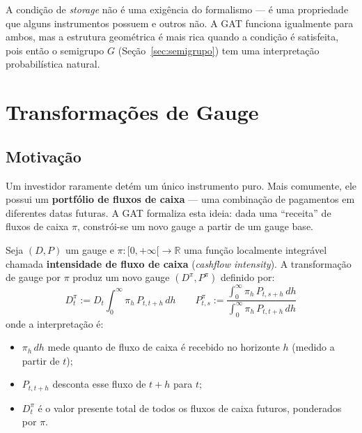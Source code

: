 A condi\c{c}\~ao de \textit{storage} n\~ao \'e uma exig\^encia do
formalismo --- \'e uma propriedade que alguns instrumentos possuem e
outros n\~ao. A GAT funciona igualmente para ambos, mas a estrutura
geom\'etrica \'e mais rica quando a condi\c{c}\~ao \'e satisfeita,
pois ent\~ao o semigrupo $G$ (Se\c{c}\~ao~\ref{sec:semigrupo}) tem
uma interpreta\c{c}\~ao probabil\'istica natural.

\section{Transforma\c{c}\~oes de Gauge}

\subsection{Motiva\c{c}\~ao}

Um investidor raramente det\'em um \'unico instrumento puro. Mais
comumente, ele possui um \textbf{portf\'olio de fluxos de caixa} ---
uma combina\c{c}\~ao de pagamentos em diferentes datas futuras. A GAT
formaliza esta ideia: dada uma ``receita'' de fluxos de caixa $\pi$,
constr\'oi-se um novo gauge a partir de um gauge base.

\begin{defi}\label{def:gauge_transform}
Seja $(D,P)$ um gauge e $\pi: [0,+\infty[ \to \mathbb{R}$ uma
fun\c{c}\~ao localmente integr\'avel chamada \textbf{intensidade de
fluxo de caixa} (\textit{cashflow intensity}). A transforma\c{c}\~ao de
gauge por $\pi$ produz um novo gauge $(D^\pi, P^\pi)$ definido por:
\[
\boxed{D_t^\pi := D_t \int_0^\infty \pi_h\, P_{t,t+h}\,dh}
\qquad
\boxed{P_{t,s}^\pi := \frac{\displaystyle\int_0^\infty \pi_h\, P_{t,s+h}\,dh}
 {\displaystyle\int_0^\infty \pi_h\, P_{t,t+h}\,dh}}
\]
onde a interpreta\c{c}\~ao \'e:
\begin{itemize}[nosep]
 \item $\pi_h\,dh$ mede quanto de fluxo de caixa \'e recebido no
 horizonte $h$ (medido a partir de $t$);
 \item $P_{t,t+h}$ desconta esse fluxo de $t+h$ para $t$;
 \item $D_t^\pi$ \'e o valor presente total de todos os fluxos de
 caixa futuros, ponderados por $\pi$.
\end{itemize}
\end{defi}

